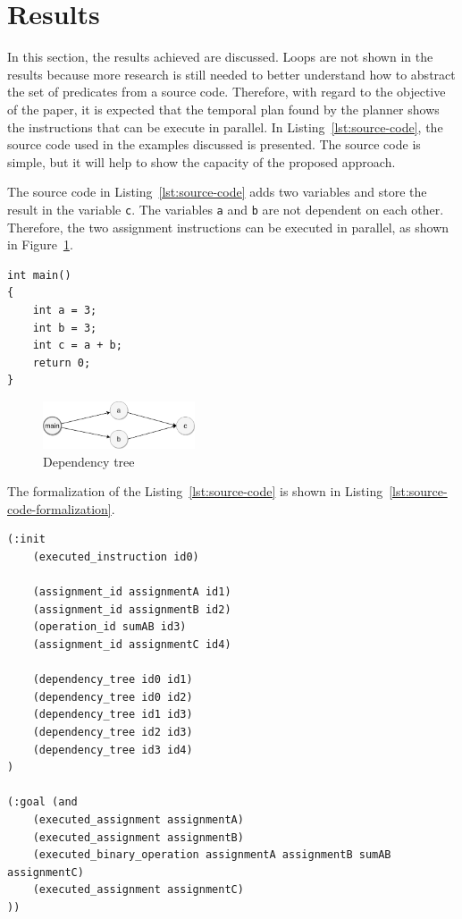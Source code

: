 \documentclass[letterpaper]{article}
\begin{document}
\section{Results}

In this section, the results achieved are discussed. Loops are not shown in the results because more research is still needed to better understand how to abstract the set of predicates from a source code. Therefore, with regard to the objective of the paper, it is expected that the temporal plan found by the planner shows the instructions that can be execute in parallel. In Listing~\ref{lst:source-code}, the source code used in the examples discussed is presented. The source code is simple, but it will help to show the capacity of the proposed approach.

The source code in Listing~\ref{lst:source-code} adds two variables and store the result in the variable \texttt{c}. The variables \texttt{a} and \texttt{b} are not dependent on each other. Therefore, the two assignment instructions can be executed in parallel, as shown in Figure~\ref{fig:dependency-tree-parallel}.

\begin{lstlisting}[caption=Source code,label=lst:source-code,style=cppStyle]
int main()
{
    int a = 3;
    int b = 3;
    int c = a + b;
    return 0;
}
\end{lstlisting}

\begin{figure}[h]
    \centering
    \includegraphics[width=0.4\textwidth]{./images/dependency-tree-Parallel.png}
    \caption{Dependency tree}
    \label{fig:dependency-tree-parallel}
\end{figure}

The formalization of the Listing~\ref{lst:source-code} is shown in Listing~\ref{lst:source-code-formalization}.

\begin{lstlisting}[caption=Source code formalization,label=lst:source-code-formalization,style=pddlStyle]
(:init
    (executed_instruction id0)

    (assignment_id assignmentA id1)
    (assignment_id assignmentB id2)
    (operation_id sumAB id3)
    (assignment_id assignmentC id4)
    
    (dependency_tree id0 id1)
    (dependency_tree id0 id2)
    (dependency_tree id1 id3)
    (dependency_tree id2 id3)
    (dependency_tree id3 id4)
)

(:goal (and
    (executed_assignment assignmentA)
    (executed_assignment assignmentB)
    (executed_binary_operation assignmentA assignmentB sumAB assignmentC)
    (executed_assignment assignmentC)
))
\end{lstlisting}
\end{document}
